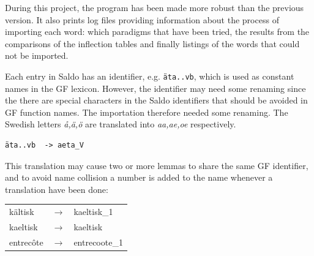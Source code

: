 \documentclass{report}
\begin{document}
During this project, the program has been made more robust than the previous
version. It also prints log files providing
information about the process of importing each word: which paradigms that have been
tried, the results from the comparisons of the inflection tables and finally listings
of the words that could not be imported.

Each entry in Saldo has an identifier, e.g. \verb-äta..vb-, which is used as 
constant names in the GF lexicon. However, the identifier may need some renaming since
the there are special characters  in the Saldo identifiers
that should be avoided in GF function names. The importation therefore
needed some renaming. The Swedish letters \emph{å,ä,ö} are translated into
\emph{aa,ae,oe} respectively. 
\begin{verbatim}äta..vb  -> aeta_V \end{verbatim}
This translation may cause two or more lemmas to share the same
GF identifier, and to avoid name collision a number is added to the name
whenever a translation have been done: 
\begin{tabular}{lll}
kältisk & $\rightarrow$ & kaeltisk\_1 \\
kaeltisk & $\rightarrow$ & kaeltisk \\
entrecôte &$\rightarrow$ & entrecoote\_1 \\ 
\end{tabular}\\


\end{document}
